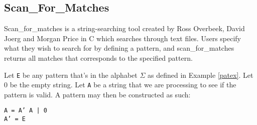 \documentclass[11pt,twoside,a4paper]{article}
\begin{document}
\subsection{Scan\_For\_Matches}
Scan\_for\_matches is a string-searching tool created by Ross Overbeek, David 
Joerg and Morgan Price in C which searches through text files. Users specify 
what they wish to search for by defining a pattern, and scan\_for\_matches 
returns all matches that corresponds to the specified pattern. 
\begin{mydef}\label{patc}
Let {\tt E} be any pattern that's in the alphabet $\Sigma$ as defined in Example \ref{patex}. 
Let 0 be the empty string.
Let {\tt A} be a string that we are processing to see if the pattern is valid.
A pattern may then be constructed as such: \begin{center}
{\tt A = A' A | 0}\\
{\tt A' = E}\end{center}
\end{mydef}
\end{document}
